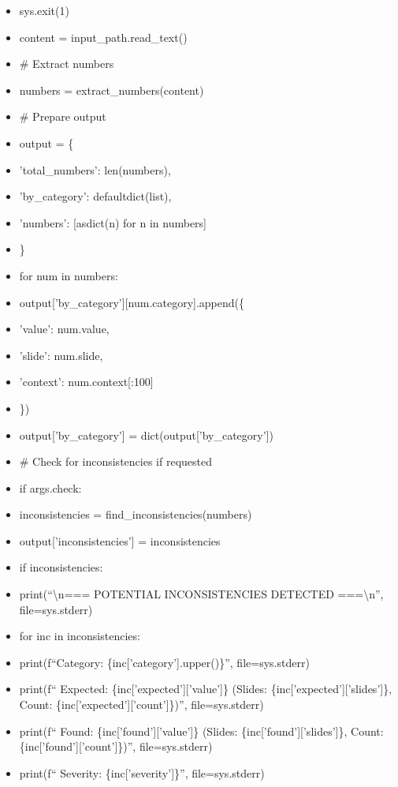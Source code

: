 \documentclass[11pt]{article}
\begin{document}
\begin{itemize}[leftmargin=*,itemsep=2pt,topsep=2pt]
\item {} sys.exit(1)
\item {} content = input\_\allowbreak{}path.read\_\allowbreak{}text()
\item {} \# Extract numbers
\item {} numbers = extract\_\allowbreak{}numbers(content)
\item {} \# Prepare output
\item {} output = \{
\item {} 'total\_\allowbreak{}numbers': len(numbers),
\item {} 'by\_\allowbreak{}category': defaultdict(list),
\item {} 'numbers': [asdict(n) for n in numbers]
\item {} \}
\item {} for num in numbers:
\item {} output['by\_\allowbreak{}category'][num.category].append(\{
\item {} 'value': num.value,
\item {} 'slide': num.slide,
\item {} 'context': num.context[:100]
\item {} \})
\item {} output['by\_\allowbreak{}category'] = dict(output['by\_\allowbreak{}category'])
\item {} \# Check for inconsistencies if requested
\item {} if args.check:
\item {} inconsistencies = find\_\allowbreak{}inconsistencies(numbers)
\item {} output['inconsistencies'] = inconsistencies
\item {} if inconsistencies:
\item {} print(``\textbackslash{}n=== POTENTIAL INCONSISTENCIES DETECTED ===\textbackslash{}n'', file=sys.stderr)
\item {} for inc in inconsistencies:
\item {} print(f``Category: \{inc['category'].upper()\}'', file=sys.stderr)
\item {} print(f`` Expected: \{inc['expected']['value']\} (Slides: \{inc['expected']['slides']\}, Count: \{inc['expected']['count']\})'', file=sys.stderr)
\item {} print(f`` Found: \{inc['found']['value']\} (Slides: \{inc['found']['slides']\}, Count: \{inc['found']['count']\})'', file=sys.stderr)
\item {} print(f`` Severity: \{inc['severity']\}'', file=sys.stderr)

\end{itemize}
\end{document}

